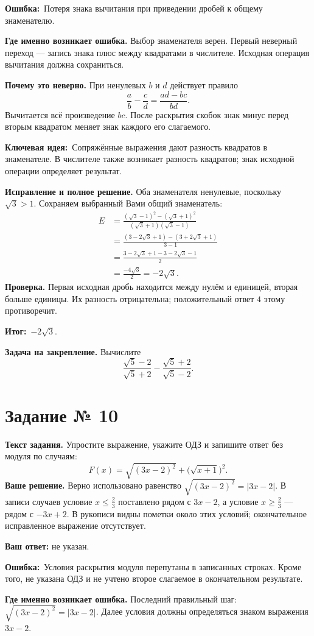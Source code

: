 \documentclass[a4paper,11pt]{article}
\newcommand{\err}{\textcolor{red!75!black}{\textbf{Ошибка:}}}
\newcommand{\idea}{\textcolor{blue!60!black}{\textbf{Ключевая идея:}}}
\newcommand{\result}{\textcolor{teal!60!black}{\textbf{Итог:}}}
\newcommand{\taskhead}[1]{\phantomsection\label{task:#1}\section*{\textcolor{accent}{Задание № #1}}}
\begin{document}
\err\ Потеря знака вычитания при приведении дробей к общему знаменателю.

\textbf{Где именно возникает ошибка.} Выбор знаменателя верен. Первый неверный переход --- запись знака плюс между квадратами в числителе. Исходная операция вычитания должна сохраниться.

\textbf{Почему это неверно.} При ненулевых $b$ и $d$ действует правило
\[
\frac ab-\frac cd=\frac{ad-bc}{bd}.
\]
Вычитается всё произведение $bc$. После раскрытия скобок знак минус перед вторым квадратом меняет знак каждого его слагаемого.

\idea\ Сопряжённые выражения дают разность квадратов в знаменателе. В числителе также возникает разность квадратов; знак исходной операции определяет результат.

\textbf{Исправление и полное решение.} Оба знаменателя ненулевые, поскольку $\sqrt3>1$. Сохраняем выбранный Вами общий знаменатель:
\begin{align*}
E&=\frac{(\sqrt3-1)^2-(\sqrt3+1)^2}{(\sqrt3+1)(\sqrt3-1)}\\
&=\frac{(3-2\sqrt3+1)-(3+2\sqrt3+1)}{3-1}\\
&=\frac{3-2\sqrt3+1-3-2\sqrt3-1}{2}\\
&=\frac{-4\sqrt3}{2}=-2\sqrt3.
\end{align*}
\textbf{Проверка.} Первая исходная дробь находится между нулём и единицей, вторая больше единицы. Их разность отрицательна; положительный ответ $4$ этому противоречит.

\result\ $\boxed{-2\sqrt3}$.

\textbf{Задача на закрепление.} Вычислите
\[
\frac{\sqrt5-2}{\sqrt5+2}-\frac{\sqrt5+2}{\sqrt5-2}.
\]
\clearpage
\taskhead{10}
\textbf{Текст задания.} Упростите выражение, укажите ОДЗ и запишите ответ без модуля по случаям:
\[
F(x)=\sqrt{(3x-2)^2}+\bigl(\sqrt{x+1}\bigr)^2.
\]
\textbf{Ваше решение.} Верно использовано равенство $\sqrt{(3x-2)^2}=|3x-2|$. В записи случаев условие $x\le\frac23$ поставлено рядом с $3x-2$, а условие $x\ge\frac23$ --- рядом с $-3x+2$. В рукописи видны пометки около этих условий; окончательное исправленное выражение отсутствует.

\textbf{Ваш ответ:} не указан.

\err\ Условия раскрытия модуля перепутаны в записанных строках. Кроме того, не указана ОДЗ и не учтено второе слагаемое в окончательном результате.

\textbf{Где именно возникает ошибка.} Последний правильный шаг: $\sqrt{(3x-2)^2}=|3x-2|$. Далее условия должны определяться знаком выражения $3x-2$.
\end{document}
